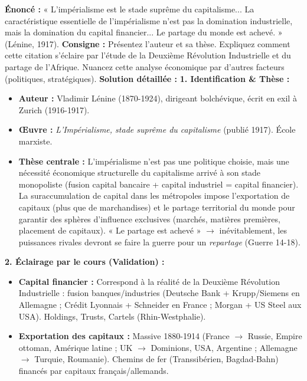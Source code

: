 \documentclass[11pt]{article}
\newcommand{\cle}[1]{{\popxbold\color{popdark}#1}}
\begin{document}
\begin{exoresolu}
\textbf{Énoncé :} « L'impérialisme est le stade suprême du capitalisme... La caractéristique essentielle de l'impérialisme n'est pas la domination industrielle, mais la domination du capital financier... Le partage du monde est achevé. » (Lénine, 1917).
\textbf{Consigne :} Présentez l'auteur et sa thèse. Expliquez comment cette citation s'éclaire par l'étude de la Deuxième Révolution Industrielle et du partage de l'Afrique. Nuancez cette analyse économique par d'autres facteurs (politiques, stratégiques).
\tcblower
\textbf{Solution détaillée :}
\textbf{1. Identification \& Thèse :}
\begin{itemize}
    \item \textbf{Auteur :} Vladimir \cle{Lénine} (1870-1924), dirigeant bolchévique, écrit en exil à Zurich (1916-1917).
    \item \textbf{Œuvre :} \emph{L'Impérialisme, stade suprême du capitalisme} (publié 1917). École \cle{marxiste}.
    \item \textbf{Thèse centrale :} L'impérialisme n'est pas une politique choisie, mais une \cle{nécessité économique} structurelle du capitalisme arrivé à son stade monopoliste (fusion capital bancaire + capital industriel = \cle{capital financier}). La suraccumulation de capital dans les métropoles impose l'exportation de capitaux (plus que de marchandises) et le partage territorial du monde pour garantir des sphères d'influence exclusives (marchés, matières premières, placement de capitaux). « Le partage est achevé » $\rightarrow$ inévitablement, les puissances rivales devront se faire la guerre pour un \emph{repartage} (Guerre 14-18).
\end{itemize}
\textbf{2. Éclairage par le cours (Validation) :}
\begin{itemize}
    \item \textbf{Capital financier :} Correspond à la réalité de la \cle{Deuxième Révolution Industrielle} : fusion banques/industries (Deutsche Bank + Krupp/Siemens en Allemagne ; Crédit Lyonnais + Schneider en France ; Morgan + US Steel aux USA). Holdings, Trusts, Cartels (Rhin-Westphalie).
    \item \textbf{Exportation des capitaux :} Massive 1880-1914 (France $\rightarrow$ Russie, Empire ottoman, Amérique latine ; UK $\rightarrow$ Dominions, USA, Argentine ; Allemagne $\rightarrow$ Turquie, Roumanie). Chemins de fer (Transsibérien, Bagdad-Bahn) financés par capitaux français/allemands.

\end{itemize}
\end{exoresolu}
\end{document}
